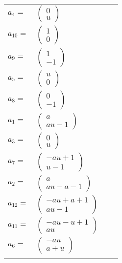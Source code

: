 \documentclass[1p]{elsarticle_modified}
\theoremstyle{definition}
\begin{document}
\begin{tabular}{m{7pt} m{180pt} m{7pt} m{180pt} }
\flushright $a_{4}=$&$\begin{pmatrix}0\\u\end{pmatrix}$ \\
\flushright $a_{10}=$&$\begin{pmatrix}1\\0\end{pmatrix}$ \\
\flushright $a_{9}=$&$\begin{pmatrix}1\\-1\end{pmatrix}$ \\
\flushright $a_{5}=$&$\begin{pmatrix}u\\0\end{pmatrix}$ \\
\flushright $a_{8}=$&$\begin{pmatrix}0\\-1\end{pmatrix}$ \\
\flushright $a_{1}=$&$\begin{pmatrix}a\\a u-1\end{pmatrix}$ \\
\flushright $a_{3}=$&$\begin{pmatrix}0\\u\end{pmatrix}$ \\
\flushright $a_{7}=$&$\begin{pmatrix}- a u+1\\u-1\end{pmatrix}$ \\
\flushright $a_{2}=$&$\begin{pmatrix}a\\a u- a-1\end{pmatrix}$ \\
\flushright $a_{12}=$&$\begin{pmatrix}- a u+a+1\\a u-1\end{pmatrix}$ \\
\flushright $a_{11}=$&$\begin{pmatrix}- a u- u+1\\a u\end{pmatrix}$ \\
\flushright $a_{6}=$&$\begin{pmatrix}- a u\\a+u\end{pmatrix}$\\&\end{tabular}
\end{document}
